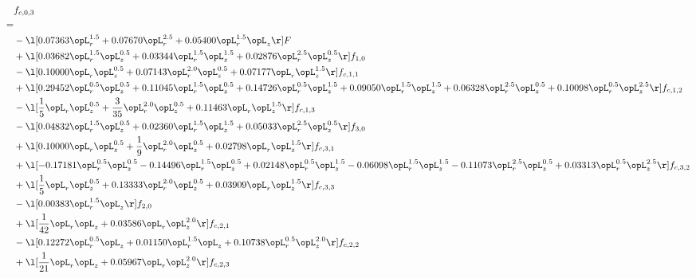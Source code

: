 \begin{alignat}{2} 
\label{eq:f_03_2} 
& f_{c,0,3} \nonumber \\ 
 = \\ 
& - \l[  0.07363 \opL_r^{1.5} +  0.07670 \opL_r^{2.5} +  0.05400 \opL_r^{1.5} \opL_z  \r] F \nonumber \\ 
& + \l[  0.03682 \opL_r^{1.5} \opL_z^{0.5} +  0.03344 \opL_r^{1.5} \opL_z^{1.5} +  0.02876 \opL_r^{2.5} \opL_z^{0.5}  \r] f_{1,0} \nonumber \\ 
& - \l[  0.10000 \opL_r \opL_z^{0.5} +  0.07143 \opL_r^{2.0} \opL_z^{0.5} +  0.07177 \opL_r \opL_z^{1.5}  \r] f_{c,1,1} \nonumber \\ 
& + \l[  0.29452 \opL_r^{0.5} \opL_z^{0.5} +  0.11045 \opL_r^{1.5} \opL_z^{0.5} +  0.14726 \opL_r^{0.5} \opL_z^{1.5} +  0.09050 \opL_r^{1.5} \opL_z^{1.5} +  0.06328 \opL_r^{2.5} \opL_z^{0.5} +  0.10098 \opL_r^{0.5} \opL_z^{2.5}  \r] f_{c,1,2} \nonumber \\ 
& - \l[ \frac{1}{5} \opL_r \opL_z^{0.5} + \frac{3}{35} \opL_r^{2.0} \opL_z^{0.5} +  0.11463 \opL_r \opL_z^{1.5}  \r] f_{c,1,3} \nonumber \\ 
& - \l[  0.04832 \opL_r^{1.5} \opL_z^{0.5} +  0.02360 \opL_r^{1.5} \opL_z^{1.5} +  0.05033 \opL_r^{2.5} \opL_z^{0.5}  \r] f_{3,0} \nonumber \\ 
& + \l[  0.10000 \opL_r \opL_z^{0.5} + \frac{1}{9} \opL_r^{2.0} \opL_z^{0.5} +  0.02798 \opL_r \opL_z^{1.5}  \r] f_{c,3,1} \nonumber \\ 
& + \l[  -0.17181 \opL_r^{0.5} \opL_z^{0.5}   -0.14496 \opL_r^{1.5} \opL_z^{0.5} +  0.02148 \opL_r^{0.5} \opL_z^{1.5}   -0.06098 \opL_r^{1.5} \opL_z^{1.5}   -0.11073 \opL_r^{2.5} \opL_z^{0.5} +  0.03313 \opL_r^{0.5} \opL_z^{2.5}  \r] f_{c,3,2} \nonumber \\ 
& + \l[ \frac{1}{5} \opL_r \opL_z^{0.5} +  0.13333 \opL_r^{2.0} \opL_z^{0.5} +  0.03909 \opL_r \opL_z^{1.5}  \r] f_{c,3,3} \nonumber \\ 
& - \l[  0.00383 \opL_r^{1.5} \opL_z  \r] f_{2,0} \nonumber \\ 
& + \l[ \frac{1}{42} \opL_r \opL_z +  0.03586 \opL_r \opL_z^{2.0}  \r] f_{c,2,1} \nonumber \\ 
& - \l[  0.12272 \opL_r^{0.5} \opL_z +  0.01150 \opL_r^{1.5} \opL_z +  0.10738 \opL_r^{0.5} \opL_z^{2.0}  \r] f_{c,2,2} \nonumber \\ 
& + \l[ \frac{1}{21} \opL_r \opL_z +  0.05967 \opL_r \opL_z^{2.0}  \r] f_{c,2,3} \nonumber \\ 
\end{alignat} 


